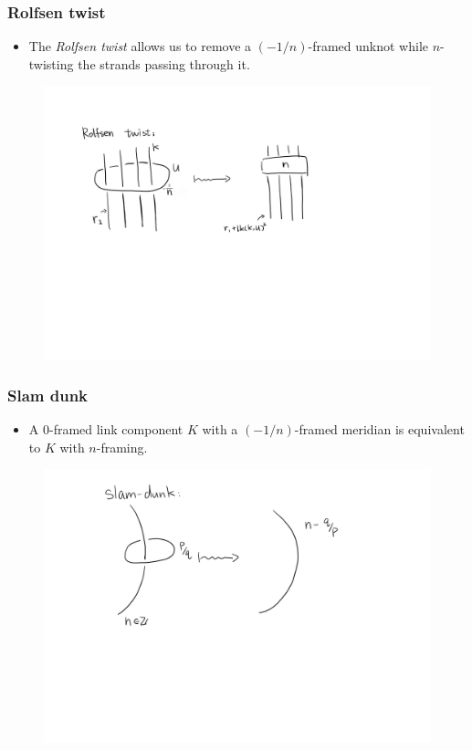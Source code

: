 \documentclass{beamer}
\theoremstyle{ex}
\theoremstyle{rem}
\begin{document}
	\begin{frame}
		\frametitle{Rolfsen twist}
		\begin{itemize}
			\item The \textit{Rolfsen twist} allows us to remove a $(-1/n)$-framed unknot while $n$-twisting the strands passing through it.
		\end{itemize}
		\begin{figure}
			\includegraphics[width=\textwidth]{rolfsentwist}
		\end{figure}
	\end{frame}
	
	\begin{frame}
		\frametitle{Slam dunk}
		\begin{itemize}
			\item A $0$-framed link component $K$ with a $(-1/n)$-framed meridian is equivalent to $K$ with $n$-framing.
		\end{itemize}
		\begin{figure}
			\includegraphics[width=\textwidth]{slamdunk}
		\end{figure}
	\end{frame}
\end{document}
